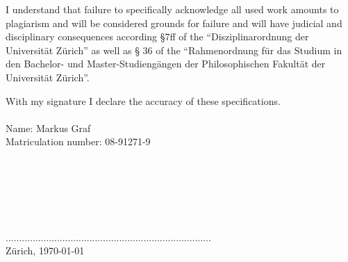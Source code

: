 \documentclass[12pt,doc]{apa}
\begin{document}
I understand that failure to specifically acknowledge all used work amounts to plagiarism and will be considered grounds for failure and will have judicial and disciplinary consequences according §7ff of the ``Disziplinarordnung der Universität Zürich'' as well as § 36 of the ``Rahmenordnung für das Studium in den Bachelor- und Master-Studiengängen der Philosophischen Fakultät der Universität Zürich''. 

With my signature I declare the accuracy of these specifications.
\\
\\
Name: Markus Graf\\
Matriculation number:  08-91271-9\\
\\
\\
\\
\\
\\
\\
............................................................................\\
Zürich, \today
\end{document}
